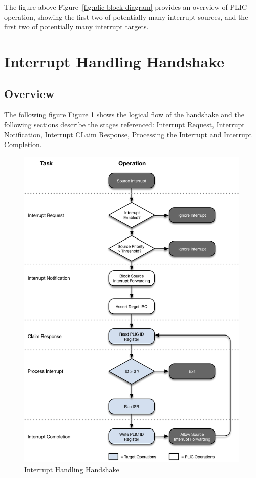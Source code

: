 \ifdefined\MARKDOWN
The figure above
\else
Figure~\ref{fig:plic-block-diagram} 
\fi
 provides an overview of PLIC operation, showing the first two of potentially many interrupt sources, and the first two of potentially many interrupt targets. 

\section{Interrupt Handling Handshake}

\subsection{Overview}

\ifdefined\MARKDOWN
The following figure
\else
Figure \ref{fig:HANDSHAKE} 
\fi
shows the logical flow of the handshake and the following sections describe the stages referenced: Interrupt Request, Interrupt Notification, Interrupt CLaim Response, Processing the Interrupt and Interrupt Completion.

\begin{figure}[!htb]

\includegraphics{assets/img/plic-handshake}
\caption{Interrupt Handling Handshake}
\label{fig:HANDSHAKE}
\end{figure}

